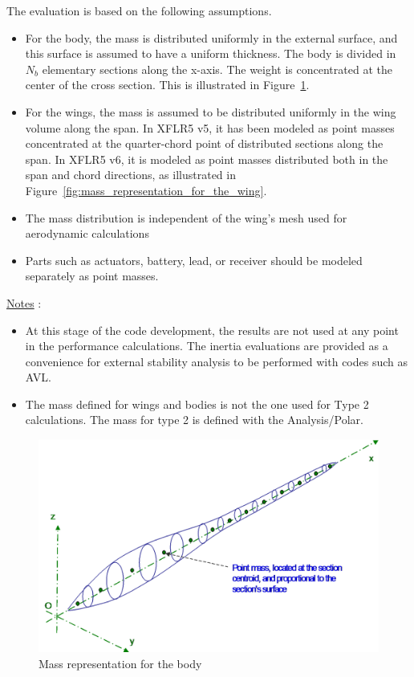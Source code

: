 \documentclass[a4paper,twoside,12pt,dvips]{article}
\begin{document}
The evaluation is based on the following assumptions.

\begin{itemize}
\item For the body, the mass is distributed uniformly in the external
surface, and this surface is assumed to have a uniform thickness. The
body is divided in $N_b$ elementary sections along the x-axis. The
weight is concentrated at the center of the cross section. This is
illustrated in Figure~\ref{fig:mass_representation_for_the_body}.
\item For the wings, the mass is assumed to be distributed uniformly
in the wing volume along the span.\newline
In XFLR5 v5, it has been modeled as point masses concentrated at the
quarter-chord point of distributed sections along the span.\newline
In XFLR5 v6, it is modeled as point masses distributed both in the
span and chord directions, as illustrated in
Figure~\ref{fig:mass_representation_for_the_wing}.
\item The mass distribution is independent of the wing's mesh used for
aerodynamic calculations
\item Parts such as actuators, battery, lead, or receiver should be
modeled separately as point masses.
\end{itemize}

\underline{Notes} :

\begin{itemize}
\item At this stage of the code development, the results are not used
at any point in the performance calculations. The inertia evaluations
are provided as a convenience for external stability analysis to be
performed with codes such as AVL.
\item The mass defined for wings and bodies is not the one used for
Type 2 calculations. The mass for type 2 is defined with the
Analysis/Polar.
\end{itemize}

\begin{figure}[htbp]
  \includegraphics[width=0.8\linewidth]{img-09}\centering 
  \caption{Mass representation for the body}
  \label{fig:mass_representation_for_the_body}
\end{figure}
\end{document}
